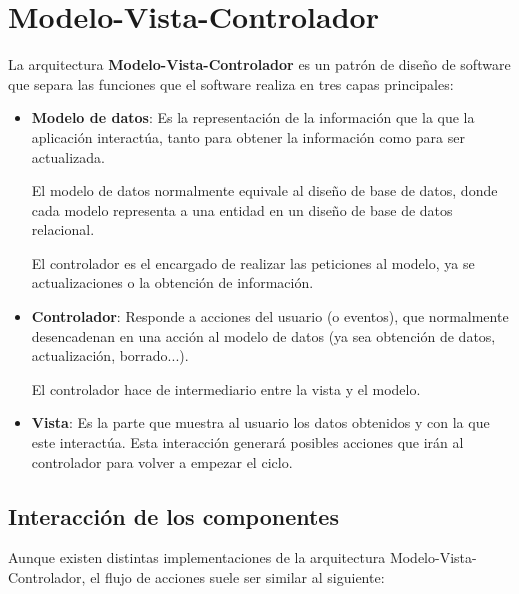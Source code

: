 \chapter{Modelo-Vista-Controlador}

La arquitectura \textbf{Modelo-Vista-Controlador} es un patrón de diseño de software que separa las funciones que el software realiza en tres capas principales:

\begin{itemize}
    \item \textbf{Modelo de datos}: Es la representación de la información que la que la aplicación interactúa, tanto para obtener la información como para ser actualizada.

    El modelo de datos normalmente equivale al diseño de base de datos, donde cada modelo representa a una entidad en un diseño de base de datos relacional.

    El controlador es el encargado de realizar las peticiones al modelo, ya se actualizaciones o la obtención de información.

    \item \textbf{Controlador}: Responde a acciones del usuario (o eventos), que normalmente desencadenan en una acción al modelo de datos (ya sea obtención de datos, actualización, borrado...).

    El controlador hace de intermediario entre la vista y el modelo.

    \item \textbf{Vista}: Es la parte que muestra al usuario los datos obtenidos y con la que este interactúa. Esta interacción generará posibles acciones que irán al controlador para volver a empezar el ciclo.
\end{itemize}

\section{Interacción de los componentes}

Aunque existen distintas implementaciones de la arquitectura Modelo-Vista-Controlador, el flujo de acciones suele ser similar al siguiente:

